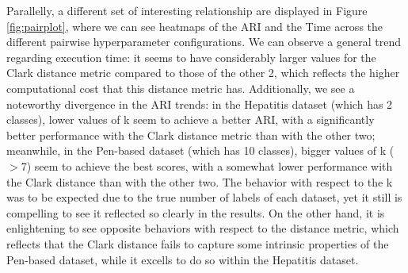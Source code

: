 Parallelly, a different set of interesting relationship are displayed in Figure \ref{fig:pairplot}, where we can see heatmaps of the ARI and the Time across the different pairwise hyperparameter configurations. We can observe a general trend regarding execution time: it seems to have considerably larger values for the Clark distance metric compared to those of the other 2, which reflects the higher computational cost that this distance metric has. Additionally, we see a noteworthy divergence in the ARI trends: in the Hepatitis dataset (which has 2 classes), lower values of k seem to achieve a better ARI, with a significantly better performance with the Clark distance metric than with the other two; meanwhile, in the Pen-based dataset (which has 10 classes), bigger values of k ($>$7) seem to achieve the best scores, with a somewhat lower performance with the Clark distance than with the other two. The behavior with respect to the k was to be expected due to the true number of labels of each dataset, yet it still is compelling to see it reflected so clearly in the results. On the other hand, it is enlightening to see opposite behaviors with respect to the distance metric, which reflects that the Clark distance fails to capture some intrinsic properties of the Pen-based dataset, while it excells to do so within the Hepatitis dataset.

